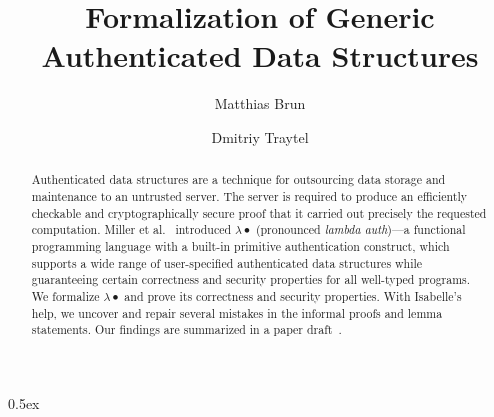 \documentclass[10pt,a4paper]{article}
\begin{document}
\title{Formalization of Generic Authenticated Data Structures}
\author{Matthias Brun \and Dmitriy Traytel}

\maketitle

\begin{abstract} Authenticated data structures are a technique for outsourcing data storage and maintenance to an untrusted server.
The server is required to produce an efficiently checkable and cryptographically secure proof that it carried out precisely the
requested computation. Miller et al.~\cite{adsg} introduced $\lambda\bullet$ (pronounced \emph{lambda auth})---a functional
programming language with a built-in primitive authentication construct, which supports a wide range of user-specified authenticated
data structures while guaranteeing certain correctness and security properties for all well-typed programs.
%
We formalize $\lambda\bullet$ and prove its correctness and security properties. With Isabelle's help, we uncover and repair several
mistakes in the informal proofs and lemma statements. Our findings are summarized in a paper draft~\cite{gadsf}.
\end{abstract}

\tableofcontents

\parindent 0pt\parskip 0.5ex





\end{document}
